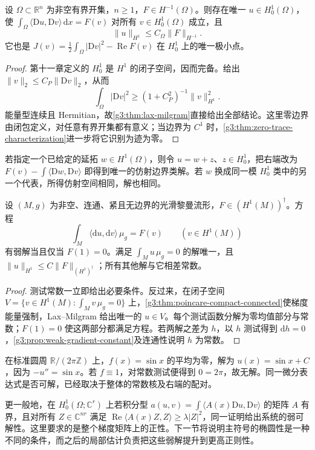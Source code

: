 \begin{theorem}\label{g3:thm:weak-poisson-dirichlet}
	设 \(\Omega\subset\mathbb R^n\) 为非空有界开集，\(n\ge1\)，\(F\in H^{-1}(\Omega)\)。则存在唯一 \(u\in H_0^1(\Omega)\)，使 \(\int_\Omega\langle\mathrm Du,\mathrm Dv\rangle\,\mathrm dx=F(v)\) 对所有 \(v\in H_0^1(\Omega)\) 成立，且
	\[
		\|u\|_{H^1}\le C_\Omega\|F\|_{H^{-1}}.
	\]
	它也是 \(J(v)=\tfrac12\int_\Omega|\mathrm Dv|^2-\operatorname{Re}F(v)\) 在 \(H_0^1\) 上的唯一极小点。
\end{theorem}
\begin{proof}
	第十一章定义的 \(H_0^1\) 是 \(H^1\) 的闭子空间，因而完备。给出 \(\|v\|_2\le C_P\|\mathrm Dv\|_2\)，从而
	\[
		\int_\Omega|\mathrm Dv|^2\ge(1+C_P^2)^{-1}\|v\|_{H^1}^2.
	\]
	能量型连续且 Hermitian，故\cref{g3:thm:lax-milgram}直接给出全部结论。这里零边界由闭包定义，对任意有界开集都有意义；当边界为 \(C^1\) 时，\cref{g3:thm:zero-trace-characterization}进一步将它识别为迹为零。
\end{proof}

若指定一个已给定的延拓 \(w\in H^1(\Omega)\)，则令 \(u=w+z\)、\(z\in H_0^1\)，把右端改为 \(F(v)-\int\langle\mathrm Dw,\mathrm Dv\rangle\) 即得到唯一的仿射边界类解。若 \(w\) 换成同一模 \(H_0^1\) 类中的另一个代表，所得仿射空间相同，解也相同。

\begin{theorem}\label{g3:thm:weak-poisson-closed}
	设 \((M,g)\) 为非空、连通、紧且无边界的光滑黎曼流形，\(F\in(H^1(M))^\dagger\)。方程
	\[
		\int_M\langle\mathrm du,\mathrm dv\rangle\,\mu_g=F(v)
		\qquad(v\in H^1(M))
	\]
	有弱解当且仅当 \(F(1)=0\)。满足 \(\int_Mu\,\mu_g=0\) 的解唯一，且
	\(\|u\|_{H^1}\le C\|F\|_{(H^1)^\dagger}\)；所有其他解与它相差常数。
\end{theorem}
\begin{proof}
	测试常数一立即给出必要条件。反过来，在闭子空间
	\(V=\{v\in H^1(M):\int_Mv\,\mu_g=0\}\) 上，\cref{g3:thm:poincare-compact-connected}使梯度能量强制，Lax--Milgram 给出唯一的 \(u\in V\)。每个测试函数分解为零均值部分与常数；\(F(1)=0\) 使这两部分都满足方程。若两解之差为 \(h\)，以 \(h\) 测试得到 \(\mathrm dh=0\)，\cref{g3:prop:weak-gradient-constant}及连通性说明 \(h\) 为常数。
\end{proof}

\begin{example}\label{g3:exm:circle-poisson}
	在标准圆周 \(\mathbb R/(2\pi\mathbb Z)\) 上，\(f(x)=\sin x\) 的平均为零，解为 \(u(x)=\sin x+C\)，因为 \(-u''=\sin x\)。若 \(f\equiv1\)，对常数测试便得到 \(0=2\pi\)，故无解。同一微分表达式是否可解，已经取决于整体的常数核及右端的配对。
\end{example}

更一般地，在 \(H_0^1(\Omega;\mathbb C^r)\) 上若积分型
\(a(u,v)=\int\langle A(x)\mathrm Du,\mathrm Dv\rangle\) 的矩阵 \(A\) 有界，且对所有 \(Z\in\mathbb C^{nr}\) 满足 \(\operatorname{Re}\langle A(x)Z,Z\rangle\ge\lambda|Z|^2\)，同一证明给出系统的弱可解性。这里要求的是整个梯度矩阵上的正性。下一节将说明主符号的椭圆性是一种不同的条件，而之后的局部估计负责把这些弱解提升到更高正则性。
